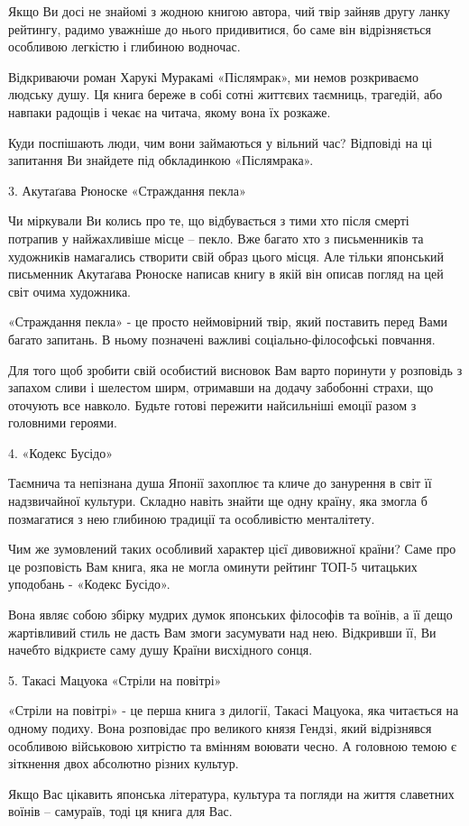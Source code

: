 Якщо Ви досі не знайомі з жодною книгою автора, чий твір зайняв другу ланку
рейтингу, радимо уважніше до нього придивитися, бо саме він відрізняється
особливою легкістю і глибиною водночас. 

Відкриваючи роман Харукі Муракамі  «Післямрак», ми немов розкриваємо людську
душу. Ця книга береже в собі сотні життєвих таємниць, трагедій, або навпаки
радощів і чекає на читача, якому вона їх розкаже. 

Куди поспішають люди, чим вони займаються у вільний час? Відповіді на ці
запитання Ви знайдете під обкладинкою  «Післямрака».

3. Акутаґава Рюноске «Страждання пекла»

Чи міркували Ви колись про те, що відбувається з тими хто після смерті потрапив
у найжахливіше місце – пекло. Вже багато хто з письменників та художників
намагались створити свій образ цього місця. Але тільки японський письменник
Акутаґава Рюноске написав книгу в якій він описав погляд на цей світ очима
художника.

«Страждання пекла» - це просто неймовірний твір, який поставить перед Вами
багато запитань. В ньому позначені важливі соціально-філософські повчання.

Для того щоб зробити свій особистий висновок Вам  варто поринути у розповідь з
запахом сливи і шелестом ширм, отримавши на додачу забобонні страхи, що
оточують все навколо. Будьте готові пережити найсильніші емоції разом з
головними героями. 

4. «Кодекс Бусідо»

Таємнича та непізнана душа Японії захоплює та кличе до занурення в світ її
надзвичайної культури. Складно навіть знайти ще одну країну, яка змогла б
позмагатися з нею глибиною традиції та особливістю менталітету. 

Чим же зумовлений таких особливий характер цієї дивовижної країни? Саме про це
розповість Вам книга, яка не могла оминути рейтинг ТОП-5 читацьких уподобань -
«Кодекс Бусідо».

Вона являє собою збірку мудрих думок японських філософів та воїнів, а її дещо
жартівливий стиль не дасть Вам змоги засумувати над нею. Відкривши її, Ви
начебто відкриєте саму душу Країни висхідного сонця.

5. Такасі Мацуока «Стріли на повітрі»

«Стріли на повітрі» - це перша книга з дилогії, Такасі Мацуока, яка читається
на одному подиху. Вона розповідає про великого князя Гендзі, який відрізнявся
особливою військовою хитрістю та вмінням воювати чесно. А головною темою є
зіткнення двох абсолютно різних культур. 

Якщо Вас цікавить японська література, культура та погляди на життя славетних
воїнів – самураїв, тоді ця книга для Вас.
